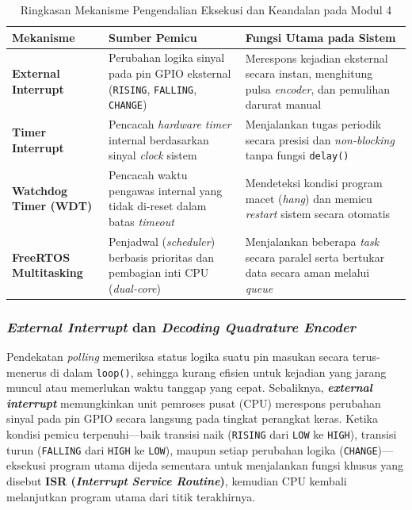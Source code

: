\begin{table}[h!]
    \centering
    \caption{Ringkasan Mekanisme Pengendalian Eksekusi dan Keandalan pada Modul 4}
    \label{tab:ringkasan_modul4}
    \vspace{4pt}
    \begin{tabularx}{\textwidth}{>{\bfseries}l X X}
        \toprule
        Mekanisme & Sumber Pemicu & Fungsi Utama pada Sistem \\
        \midrule
        External Interrupt & Perubahan logika sinyal pada pin GPIO eksternal (\texttt{RISING}, \texttt{FALLING}, \texttt{CHANGE}) & Merespons kejadian eksternal secara instan, menghitung pulsa \textit{encoder}, dan pemulihan darurat manual \\
        \addlinespace[4pt]
        Timer Interrupt & Pencacah \textit{hardware timer} internal berdasarkan sinyal \textit{clock} sistem & Menjalankan tugas periodik secara presisi dan \textit{non-blocking} tanpa fungsi \texttt{delay()} \\
        \addlinespace[4pt]
        Watchdog Timer (WDT) & Pencacah waktu pengawas internal yang tidak di-reset dalam batas \textit{timeout} & Mendeteksi kondisi program macet (\textit{hang}) dan memicu \textit{restart} sistem secara otomatis \\
        \addlinespace[4pt]
        FreeRTOS Multitasking & Penjadwal (\textit{scheduler}) berbasis prioritas dan pembagian inti CPU (\textit{dual-core}) & Menjalankan beberapa \textit{task} secara paralel serta bertukar data secara aman melalui \textit{queue} \\
        \bottomrule
    \end{tabularx}
\end{table}

\subsubsection{\textit{External Interrupt} dan \textit{Decoding Quadrature Encoder}}
Pendekatan \textit{polling} memeriksa status logika suatu pin masukan secara terus-menerus di dalam \texttt{loop()}, sehingga kurang efisien untuk kejadian yang jarang muncul atau memerlukan waktu tanggap yang cepat. Sebaliknya, \textbf{\textit{external interrupt}} memungkinkan unit pemroses pusat (CPU) merespons perubahan sinyal pada pin GPIO secara langsung pada tingkat perangkat keras. Ketika kondisi pemicu terpenuhi—baik transisi naik (\texttt{RISING} dari \texttt{LOW} ke \texttt{HIGH}), transisi turun (\texttt{FALLING} dari \texttt{HIGH} ke \texttt{LOW}), maupun setiap perubahan logika (\texttt{CHANGE})—eksekusi program utama dijeda sementara untuk menjalankan fungsi khusus yang disebut \textbf{ISR (\textit{Interrupt Service Routine})}, kemudian CPU kembali melanjutkan program utama dari titik terakhirnya.


